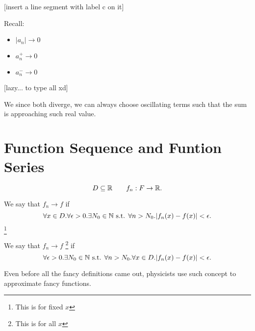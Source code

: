\documentclass[11pt, sakura, night, 1in]{hw}
\begin{document}
[insert a line segment with label c on it]


Recall:
\begin{itemize}
    \item $|a_n|\to0$
    \item $a_n^+\to 0$
    \item $a_n^-\to 0$
\end{itemize}

[lazy... to type all xd]

We since both diverge, we can always choose oscillating terms such that the sum is approaching such real value.


\section{Function Sequence and Funtion Series}


\[D\subseteq \mathbb{R} \qquad f_n: F\to \mathbb{R}.\]

We say that $f_n\to f$ \underline{} if \[\forall x\in D. \forall \epsilon>0.\exists N_0\in\mathbb{N}\text{ s.t. }\forall n> N_0. |f_n(x) - f(x) | < \epsilon.\] \footnote{This is for fixed $x$}

We say that $f_n\to f$ \underline{}\footnote{This is for all $x$} if \[\forall\epsilon>0.\exists N_0\in\mathbb{N}\text{ s.t. }\forall n>N_0. \forall x\in D. |f_n(x)-f(x)|<\epsilon.\]

Even before all the fancy definitions came out, physicists use such concept to approximate fancy functions.

\end{document}
